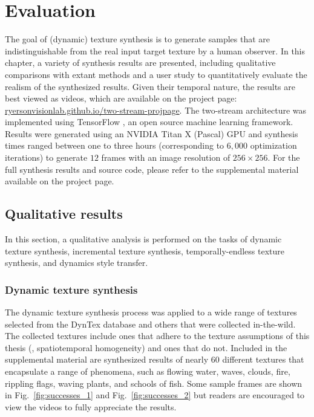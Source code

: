 \chapter{Evaluation}\label{chap:evaluation}

The goal of (dynamic) texture synthesis is to generate 
samples that are indistinguishable from the real input target
texture by a human observer.
In this chapter, a variety of synthesis results are presented,
including qualitative comparisons with extant methods and a user study to quantitatively evaluate the realism
of the synthesized results.
Given their temporal nature, the results are best viewed as 
videos, which are available on the project page: \url{ryersonvisionlab.github.io/two-stream-projpage}.
The two-stream architecture was implemented using TensorFlow
\cite{tabadi2015tensorflow}, an open source machine learning framework.
Results were generated using an NVIDIA Titan X (Pascal) GPU
and synthesis times ranged between one to three hours (corresponding to $6,000$ optimization iterations)
to generate $12$ frames with an image resolution of 
$256 \times 256$.
For the full synthesis results and source code, please refer to the
supplemental material available on the project page.

\section{Qualitative results}\label{sec:qualitative_results}

In this section, a qualitative analysis is performed on the tasks of dynamic texture synthesis, incremental texture synthesis,
temporally-endless texture synthesis, and dynamics style transfer.

\subsection{Dynamic texture synthesis}

The dynamic texture synthesis process was applied 
to a wide range of textures selected from the 
DynTex \cite{peteri2010} database and others that were collected in-the-wild.
The collected textures include ones that adhere to the texture assumptions of this thesis (\ie, spatiotemporal homogeneity) and ones that do not.
Included in the supplemental material are synthesized results
of nearly 60 different textures that encapsulate a range of
phenomena, such as flowing water, waves, clouds, fire, rippling
flags, waving plants, and schools of fish.
Some sample frames are shown in Fig.\ \ref{fig:successes_1} and Fig.\ \ref{fig:successes_2}
but readers are encouraged to view the videos to fully appreciate
the results.

